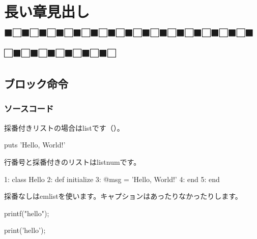 \chapter{長い章見出し■□■□■□■□■□■□■□■□■□■□■□■□■□■□■□■□■□■□■□■□■□}
\label{chap:ch02}

\section{ブロック命令}
\label{sec:2-1}

\subsection{ソースコード}
\label{sec:2-1-1}

採番付きリストの場合はlistです（）。

\begin{reviewlistblock}
\begin{reviewlist}
puts 'Hello, World!'
\end{reviewlist}
\end{reviewlistblock}


行番号と採番付きのリストはlistnumです。

\begin{reviewlistblock}
\begin{reviewlist}
 1: class Hello
 2:   def initialize
 3:     @msg = 'Hello, World!'
 4:   end
 5: end
\end{reviewlist}
\end{reviewlistblock}

採番なしはemlistを使います。キャプションはあったりなかったりします。

\begin{reviewlistblock}
\begin{reviewemlist}
printf("hello");
\end{reviewemlist}
\end{reviewlistblock}

\begin{reviewlistblock}
\begin{reviewemlist}
print('hello');
\end{reviewemlist}
\end{reviewlistblock}


